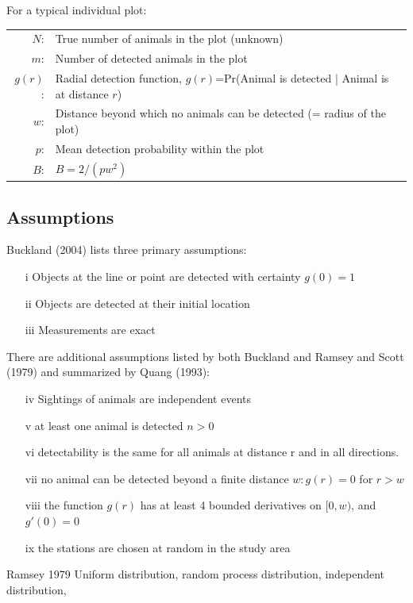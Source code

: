 \documentclass[12pt]{article}
\begin{document}
For a typical individual plot:

\begin{tabular}{r l}
$N$:	&	True number of animals in the plot (unknown)\\
$m$:	&	Number of detected animals in the plot\\
$g(r)$:	&	Radial detection function, $g(r)$=Pr(Animal is detected | Animal is at distance $r$)\\
$w$:	&	Distance beyond which no animals can be detected (= radius of the plot)\\
$p$:	& Mean detection probability within the plot\\
$B$:	&   $B = 2/(pw^2)$\\

\end{tabular}

\subsection{Assumptions}
Buckland (2004) lists three primary assumptions:
\begin{enumerate}
\item[i] Objects at the line or point are detected with certainty $g(0)=1$
\item[ii] Objects are detected at their initial location
\item[iii] Measurements are exact
\end{enumerate}

There are additional assumptions listed by both Buckland and Ramsey and Scott (1979) and summarized by Quang (1993):
\begin{enumerate}
\item[iv] Sightings of animals are independent events
\item[v] at least one animal is detected $n > 0$
\item[vi] detectability is the same for all animals at distance r and in all directions.
\item[vii] no animal can be detected beyond a finite distance $w: g(r) = 0$ for $r > w$
\item[viii] the function $g(r)$ has at least 4 bounded derivatives on $[0, w)$, and $g'(0)=0$
\item[ix] the stations are chosen at random in the study area
\end{enumerate}

Ramsey 1979
Uniform distribution, random process distribution, independent distribution, 
\end{document}
